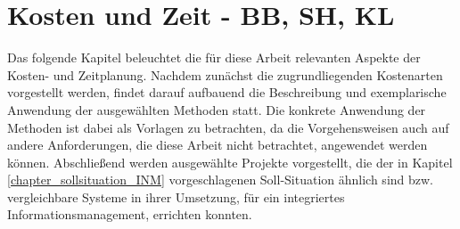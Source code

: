 
\chapter{Kosten und Zeit - BB, SH, KL}

Das folgende Kapitel beleuchtet die für diese Arbeit relevanten Aspekte der Kosten- und Zeitplanung. Nachdem zunächst die zugrundliegenden Kostenarten vorgestellt werden, findet darauf aufbauend die Beschreibung und exemplarische Anwendung der ausgewählten Methoden statt. Die konkrete Anwendung der Methoden ist dabei als Vorlagen zu betrachten, da die Vorgehensweisen auch auf andere Anforderungen, die diese Arbeit nicht betrachtet, angewendet werden k\"onnen. Abschließend werden ausgew\"ahlte Projekte vorgestellt, die der in Kapitel \ref{chapter_sollsituation_INM} vorgeschlagenen Soll-Situation \"ahnlich sind bzw. vergleichbare Systeme in ihrer Umsetzung, f\"ur ein integriertes Informationsmanagement, errichten konnten.





\clearpage

